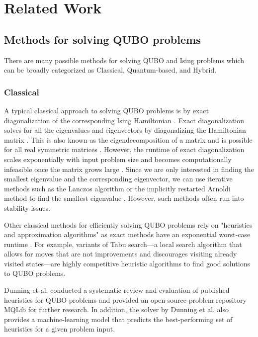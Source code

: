 \chapter{Related Work}
\label{review}
\vspace{2em}

\section{Methods for solving QUBO problems}
There are many possible methods for solving QUBO and Ising problems which can be broadly categorized as Classical, Quantum-based, and Hybrid.

\subsection{Classical}
A typical classical approach to solving QUBO problems is by exact diagonalization of the corresponding Ising Hamiltonian \cite{b25}. Exact diagonalization solves for all the eigenvalues and eigenvectors by diagonalizing the Hamiltonian matrix \cite{b25}. This is also known as the eigendecomposition of a matrix and is possible for all real symmetric matrices \cite{b27}. However, the runtime of exact diagonalization scales exponentially with input problem size and becomes computationally infeasible once the matrix grows large \cite{b25}. Since we are only interested in finding the smallest eigenvalue and the corresponding eigenvector, we can use iterative methods such as the Lanczos algorithm or the implicitly restarted Arnoldi method to find the smallest eigenvalue \cite{b28,b29}. However, such methods often run into stability issues.

Other classical methods for efficiently solving QUBO problems rely on "heuristics and approximation algorithms" as exact methods have an exponential worst-case runtime \cite{b12}. For example, variants of Tabu search---a local search algorithm that allows for moves that are not improvements and discourages visiting already visited states---are highly competitive heuristic algorithms to find good solutions to QUBO problems\cite{b2,b30}.

Dunning et al.\cite{b12} conducted a systematic review and evaluation of published heuristics for QUBO problems and provided an open-source problem repository MQLib for further research. In addition, the solver by Dunning et al.\cite{b12} also provides a machine-learning model that predicts the best-performing set of heuristics for a given problem input.

